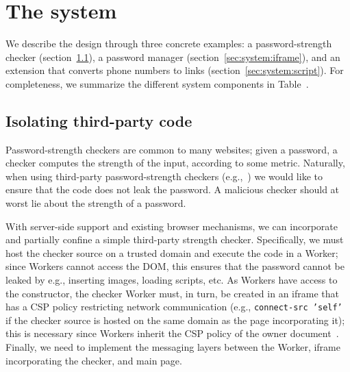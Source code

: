 \section{The \sys{} system}
\label{sec:system}

We describe the \sys{} design through three concrete examples: a
password-strength checker (section~\ref{sec:system:worker}), a
password manager (section~\ref{sec:system:iframe}), and an extension
that converts phone numbers to links
(section~\ref{sec:system:script}).
%
For completeness, we summarize the different system components in
Table~.

\subsection{Isolating third-party code}
\label{sec:system:worker}

Password-strength checkers are common to many websites;
%
given a password, a checker computes the strength of the input,
according to some metric.
%
Naturally, when using third-party password-strength checkers
(e.g.,~) we would like to ensure that the
code does not leak the password.
%
A malicious checker should at worst lie about the strength of a
password.

With server-side support and existing browser mechanisms, we can
incorporate and partially confine a simple third-party strength
checker.
%
Specifically, we must host the checker source on a trusted domain and
execute the code in a Worker; since Workers cannot access the DOM,
this ensures that the password cannot be leaked by e.g., inserting
images, loading scripts, etc.
%
As Workers have access to the \xhr{} constructor, the checker Worker
must, in turn, be created in an iframe that has a CSP policy
restricting network communication (e.g., \texttt{connect-src 'self'}
if the checker source is hosted on the same domain as the page
incorporating it); this is necessary since Workers inherit the CSP
policy of the owner document~.
%
Finally, we need to implement the messaging layers between the Worker,
iframe incorporating the checker, and main page.

